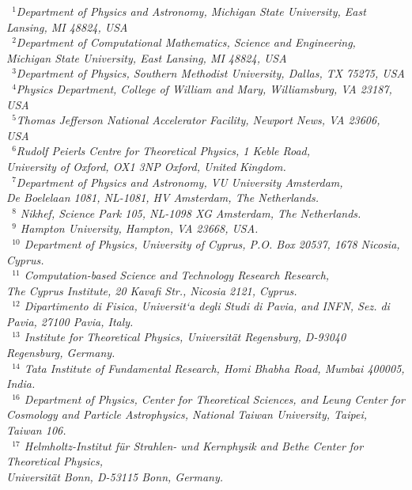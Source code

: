\documentclass[twoside,12pt]{article}
\numberwithin{equation}{section}
\numberwithin{figure}{section}
\numberwithin{table}{section}
\begin{document}
\begin{center}
\vspace{.2cm}
{\it \footnotesize
~$^{1}$Department of Physics and Astronomy, Michigan State University, East Lansing, MI 48824, USA\\
~$^{2}$Department of Computational Mathematics, Science and Engineering, \\Michigan State University, East Lansing, MI 48824, USA\\
~$^{3}$Department of Physics, Southern Methodist University, Dallas, TX 75275, USA\\
~$^{4}$Physics Department, College of William and Mary, Williamsburg, VA 23187, USA\\
~$^{5}$Thomas Jefferson National Accelerator Facility, Newport News, VA 23606, USA\\
~$^6$Rudolf Peierls Centre for Theoretical Physics, 1 Keble Road,\\ University of Oxford, OX1 3NP Oxford, United Kingdom.\\
~$^{7}$Department of Physics and Astronomy, VU University Amsterdam,\\
De Boelelaan 1081, NL-1081, HV Amsterdam, The Netherlands.\\
~$^{8}$ Nikhef, Science Park 105, NL-1098 XG Amsterdam, The Netherlands.\\
~$^{9}$ Hampton University, Hampton, VA 23668, USA.\\
~$^{10}$ Department of Physics, University of Cyprus, P.O. Box 20537, 1678 Nicosia, Cyprus. \\
~$^{11}$ Computation-based Science and Technology Research Research,\\
The Cyprus Institute, 20
Kavafi Str., Nicosia 2121, Cyprus. \\
~$^{12}$ Dipartimento di Fisica, Universit`a degli Studi di Pavia, and INFN, Sez. di Pavia, 27100 Pavia, Italy. \\
~$^{13}$ Institute for Theoretical Physics, Universit\"at Regensburg, D-93040 Regensburg, Germany. \\
~$^{14}$ Tata Institute of Fundamental Research, Homi Bhabha Road, Mumbai 400005, India. \\
~$^{16}$ Department of Physics, Center for Theoretical Sciences,
and Leung Center for Cosmology and Particle Astrophysics,
National Taiwan University, Taipei, Taiwan 106. \\
~$^{17}$ Helmholtz-Institut f\"ur Strahlen- und Kernphysik and Bethe Center
for Theoretical Physics,\\ Universit\"at Bonn, D-53115 Bonn, Germany. \\
}
\end{center}
\end{document}

